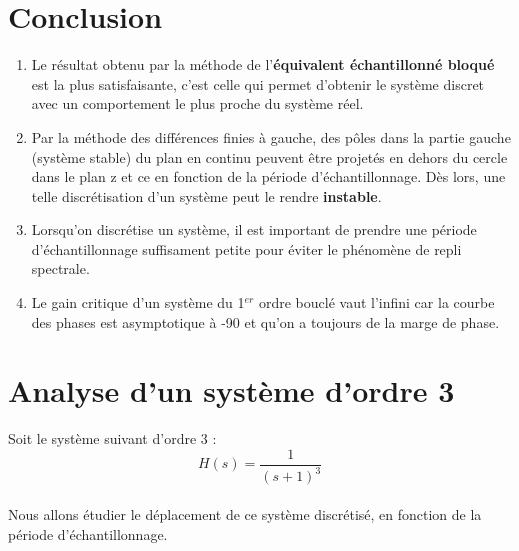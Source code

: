 \section{Conclusion}
\begin{enumerate}
\item Le résultat obtenu par la méthode de l'\textbf{équivalent échantillonné bloqué} est la plus satisfaisante, c'est celle qui permet d'obtenir le système discret avec un comportement le plus proche du système réel.
\item Par la méthode des différences finies à gauche, des pôles dans la partie  gauche (système stable) du plan en continu peuvent être projetés en dehors du cercle dans le plan z et ce en fonction de la période d'échantillonnage. Dès lors, une telle discrétisation d'un système peut le rendre \textbf{instable}.
\item Lorsqu'on discrétise un système, il est important de prendre une période d'échantillonnage suffisament petite pour éviter le phénomène de repli spectrale.
\item Le gain critique d'un système du 1$^{er}$ ordre bouclé vaut l'infini car la courbe des phases est asymptotique à -90 et qu'on a toujours de la marge de phase.
\end{enumerate}

\section{Analyse d'un système d'ordre 3}
Soit le système suivant d'ordre 3 :
\begin{equation*}
H(s) = \frac{1}{(s+1)^{3}}
\end{equation*}

\paragraph{}
Nous allons étudier le déplacement de ce système discrétisé, en fonction de la période d'échantillonnage.

